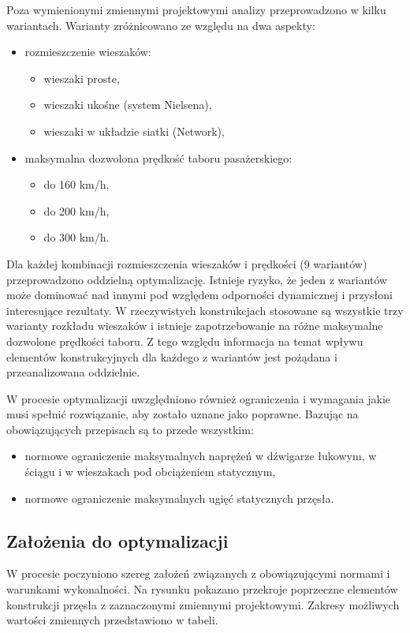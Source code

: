 Poza wymienionymi zmiennymi projektowymi analizy przeprowadzono w kilku wariantach. Warianty zróżnicowano ze względu na dwa aspekty:
\begin{itemize}
	\item rozmieszczenie wieszaków: 
	\begin{itemize}
		\item wieszaki proste,
		\item wieszaki ukośne (system Nielsena), 
		\item wieszaki w układzie siatki (Network),
	\end{itemize}
	\item maksymalna dozwolona prędkość taboru pasażerskiego:
	\begin{itemize}
		\item do 160 km/h, 
		\item do 200 km/h,
		\item do 300 km/h.
	\end{itemize} 
\end{itemize}

Dla każdej kombinacji rozmieszczenia wieszaków i prędkości (9 wariantów) przeprowadzono oddzielną optymalizację. Istnieje ryzyko, że jeden z wariantów może dominować nad innymi pod względem odporności dynamicznej  i przysłoni interesujące rezultaty. W rzeczywistych konstrukcjach stosowane są wszystkie trzy warianty rozkładu wieszaków i istnieje zapotrzebowanie na różne maksymalne dozwolone prędkości taboru. Z tego względu informacja na temat wpływu elementów konstrukcyjnych dla każdego z wariantów jest pożądana i przeanalizowana oddzielnie.

W procesie optymalizacji uwzględniono również ograniczenia i wymagania jakie musi spełnić rozwiązanie, aby zostało uznane jako poprawne. Bazując na obowiązujących przepisach są to przede wszystkim:
\begin{itemize}
	\item normowe ograniczenie maksymalnych naprężeń w dźwigarze łukowym, w ściągu i w wieszakach pod obciążeniem statycznym,
	\item normowe ograniczenie maksymalnych ugięć statycznych przęsła.
\end{itemize}

\subsection{Założenia do optymalizacji}
W procesie poczyniono szereg założeń związanych z obowiązującymi normami i warunkami wykonalności. Na rysunku pokazano przekroje poprzeczne elementów konstrukcji przęsła z zaznaczonymi zmiennymi projektowymi. Zakresy możliwych wartości zmiennych przedstawiono w tabeli.




